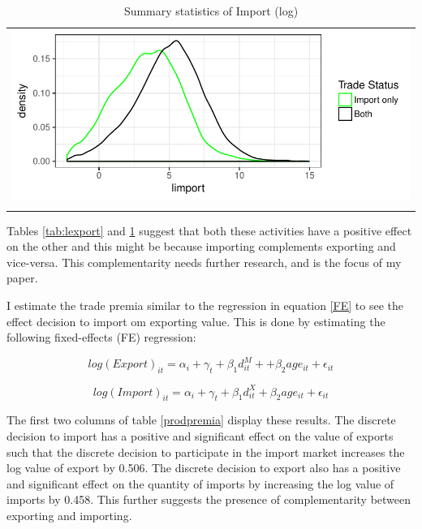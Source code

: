 \documentclass[12pt]{article}
\begin{document}
\begin{center}
\begin{table}[H]
\caption{Summary statistics of Import (log)}
\label{tab:limport}
\begin{tabular}{c}
 \includegraphics{./PICS/denslimport.pdf}   \\ 
   \\  
\end{tabular}
\end{table}
\end{center}

Tables \ref{tab:lexport} and \ref{tab:limport} suggest that both these activities have a
positive effect on the other and this might be because importing
complements exporting and vice-versa. This complementarity needs
further research, and is the focus of my paper. 

I estimate the trade premia similar to the regression in equation
\ref{FE} to see the effect decision to import om exporting value. This is done by estimating the
following fixed-effects (FE) regression:

$$  log(Export)_{it} = \alpha_{i} + \gamma_{t} +  \beta_{1} d_{it}^{M}+
+ \beta_{2} age_{it} + \epsilon_{it}$$

$$  log(Import)_{it} = \alpha_{i} + \gamma_{t} + \beta_{1} d_{it}^{X} + \beta_{2} age_{it} + \epsilon_{it}$$ 

\begin{center}

\end{center}

The first two columns of table \ref{prodpremia} display these
results. The discrete decision to import has a positive and
significant effect on the value of exports such that the discrete
decision to participate in the import market increases the log value of
export by 0.506. The discrete decision to
export also has a positive and significant effect on the quantity of
imports by increasing the log value of imports by 0.458.  This further suggests the presence of complementarity
between exporting and importing. 
\end{document}
